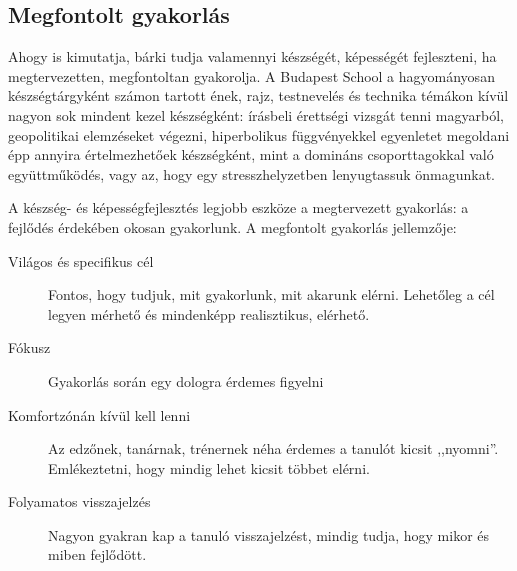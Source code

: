 \subsection{Megfontolt gyakorlás}
Ahogy \citep{ericsson2016peak} is kimutatja, bárki tudja valamennyi készségét, képességét fejleszteni, ha megtervezetten, megfontoltan gyakorolja. A Budapest School a hagyományosan készségtárgyként számon tartott ének, rajz, testnevelés és technika témákon kívül nagyon sok mindent kezel készségként: írásbeli érettségi vizsgát tenni magyarból, geopolitikai elemzéseket végezni, hiperbolikus függvényekkel egyenletet megoldani épp annyira értelmezhetőek készségként, mint a domináns csoporttagokkal való együttműködés, vagy az, hogy egy stresszhelyzetben lenyugtassuk önmagunkat.

A készség- és képességfejlesztés legjobb eszköze a megtervezett gyakorlás: a fejlődés érdekében okosan gyakorlunk. A megfontolt gyakorlás jellemzője:

\begin{description}
      \item[Világos és specifikus cél] Fontos, hogy tudjuk, mit gyakorlunk, mit
            akarunk elérni.  Lehetőleg a cél legyen mérhető és mindenképp realisztikus, elérhető.
      \item[Fókusz] Gyakorlás során egy dologra érdemes figyelni
      \item[Komfortzónán kívül kell lenni] Az edzőnek, tanárnak, trénernek
        néha\linebreak
        érdemes a tanulót kicsit ,,nyomni''. Emlékeztetni, hogy mindig lehet kicsit többet elérni.
      \item[Folyamatos visszajelzés] Nagyon gyakran kap a tanuló visszajelzést,
            mindig tudja, hogy mikor és miben fejlődött.
\end{description}
